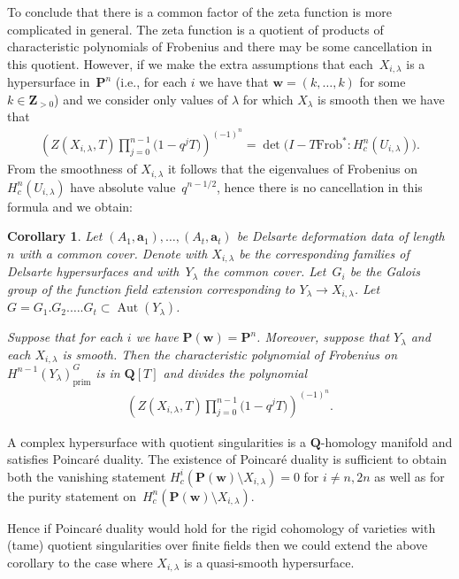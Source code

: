 \documentclass[pdftex]{sigma}
\numberwithin{equation}{section}
\newtheorem{Corollary}[Theorem]{Corollary}
\DeclareMathOperator{\Aut}{Aut}
\DeclareMathOperator{\prim}{prim}
\begin{document}
To conclude that there is a common factor of the zeta function is more complicated in general. The zeta function is a quotient of products of characteristic polynomials of Frobenius and there may be some cancellation in this quotient. However, if we make the extra assumptions that each~$X_{i,\lambda}$ is a hypersurface in~$\mathbf{P}^n$ (i.e., for each $i$ we have that $\mathbf{w}=(k,\dots,k)$ for some $k\in \mathbf{Z}_{>0}$) and we consider only values of $\lambda$ for which $X_\lambda$ is smooth then we have that
 \begin{gather*} \left(Z(X_{i,\lambda},T)\prod_{j=0}^{n-1} \big(1-q^j T\big)\right)^{(-1)^n} = \det\big(I- T \mathrm{Frob}^* \colon H^{n}_c(U_{i,\lambda})\big).\end{gather*}
From the smoothness of $X_{i,\lambda}$ it follows that the eigenvalues of Frobenius on~$H^{n}_c(U_{i,\lambda})$ have absolute value~$q^{{n-1}/2}$, hence there is no cancellation in this formula and we obtain:

\begin{Corollary}\label{corMain} Let $(A_1,\mathbf{a}_1), \dots, (A_t,\mathbf{a}_t)$ be Delsarte deformation data of length $n$ with a common cover. Denote with $X_{i,\lambda}$ be the corresponding families of Delsarte hypersurfaces and with~$Y_\lambda$ the common cover. Let~$G_i$ be the Galois group of the function field extension corresponding to $Y_\lambda\to X_{i,\lambda}$. Let $G=G_1.G_2.\dots.G_t\subset \Aut(Y_\lambda)$.

Suppose that for each $i$ we have $\mathbf{P}(\mathbf{w})=\mathbf{P}^n$. Moreover, suppose that $Y_{\lambda}$ and each $X_{i,\lambda}$ is smooth. Then the characteristic polynomial of Frobenius on $H^{n-1}(Y_\lambda)_{\prim}^G$ is in $\mathbf{Q}[T]$ and divides the polynomial
\begin{gather*} \left( {Z(X_{i,\lambda},T)}{\prod_{j=0}^{n-1} \big(1-q^jT\big)} \right)^{(-1)^n}.\end{gather*}
\end{Corollary}

\begin{Remark} A complex hypersurface with quotient singularities is a $\mathbf{Q}$-homology manifold and satisf\/ies Poincar\'e duality. The existence of Poincar\'e duality is suf\/f\/icient to obtain both the vanishing statement $H^i_c (\mathbf{P}(\mathbf{w})\setminus X_{i,\lambda})=0$ for $i\neq n,2n$ as well as for the purity statement on~$H^n_c(\mathbf{P}(\mathbf{w})\setminus X_{i,\lambda})$.

Hence if Poincar\'e duality would hold for the rigid cohomology of varieties with (tame) quotient singularities over f\/inite f\/ields then we could extend the above corollary to the case where $X_{i,\lambda}$ is a quasi-smooth hypersurface.\end{Remark}
\end{document}
